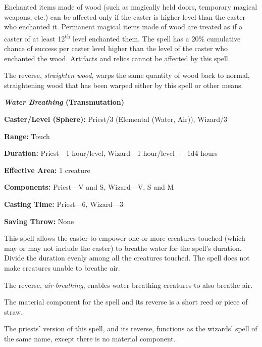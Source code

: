 \begin{multicols}{2}
Enchanted items made of wood (such as magically held doors, temporary magical weapons, etc.) can be affected only if the caster is higher level than the caster who enchanted it.  Permanent magical items made of wood are treated as if a caster of at least 12\textsuperscript{th} level enchanted them.  The spell has a 20\% cumulative chance of success per caster level higher than the level of the caster who enchanted the wood.  Artifacts and relics cannot be affected by this spell.

The reverse, \textit{straighten wood}, warps the same quantity of wood back to normal, straightening wood that has been warped either by this spell or other means. 

\vspace{1em}

\noindent
\begin{minipage}{\columnwidth}

\noindent \textbf{\textit{Water Breathing} (Transmutation)}

\noindent \textbf{Caster/Level (Sphere):} Priest/3 (Elemental (Water, Air)), Wizard/3

\noindent \textbf{Range:} Touch

\noindent \textbf{Duration:} Priest---1 hour/level, Wizard---1 hour/level~+~1d4 hours

\noindent \textbf{Effective Area:} 1 creature

\noindent \textbf{Components:} Priest---V and S, Wizard---V, S and M

\noindent \textbf{Casting Time:} Priest---6, Wizard---3

\noindent \textbf{Saving Throw:} None

\end{minipage}

This spell allows the caster to empower one or more creatures touched (which may or may not include the caster) to breathe water for the spell's duration.  Divide the duration evenly among all the creatures touched.  The spell does not make creatures unable to breathe air.

The reverse, \textit{air breathing}, enables water-breathing creatures to also breathe air.

The material component for the spell and its reverse is a short reed or piece of straw.

The priests' version of this spell, and its reverse, functions as the wizards' spell of the same name, except there is no material component.


\end{multicols}
